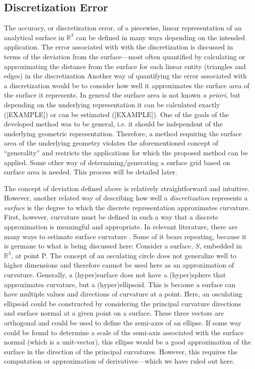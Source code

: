 \subsection{Discretization Error}
The accuracy, or discretization error, of a piecewise, linear
representation of an analytical surface in ${\mathbb R}^3$ can be
defined in many ways depending on the intended application. The error
associated with with the discretization is discussed in terms of the
deviation from the surface---most often quantified by calculating or
approximating the distance from the surface for each linear entity
(triangles and edges) in the discretization Another way of quantifying
the error associated with a discretization would be to consider how well
it approximates the surface area of the surface it represents. In
general the surface area is not known {\it a priori}, but depending on
the underlying representation it can be calculated exactly ([EXAMPLE])
or can be estimated ([EXAMPLE]).  One of the goals of the developed
method was to be general, i.e. it should be independent of the
underlying geometric representation.  Therefore, a method requiring
the surface area of the underlying geometry violates the
aforementioned concept of ``generality'' and restricts the
applications for which the proposed method can be applied. Some
other way of determining/generating a surface grid based on surface
area is needed. This process will be detailed later.

The concept of deviation defined above is relatively straightforward and
intuitive. However, another related way of describing how well a
\textit{discretization} represents a \textit{surface} is the degree to
which the discrete representation approximates curvature. First,
however, curvature must be defined in such a way that a discrete
approximation is meaningful and appropriate.  In relevant literature,
there are many ways to estimate surface curvature \cite{hermann07}. Some
of it bears repeating, because it is germane to what is being discussed
here: Consider a surface, $S$, embedded in ${\mathbb R}^3$, at point P.
The concept of an osculating circle \cite{weissteineOsculatingCircle}
does not generalize well to higher dimensions and therefore cannot be
used here as an approximation of curvature.  Generally, a (hyper)surface
does not have a (hyper)sphere that approximates curvature, but a
(hyper)ellipsoid. This is because a surface can have multiple values and
directions of curvature at a point.  Here, an osculating ellipsoid could
be constructed by considering the principal curvature directions and
surface normal at a given point on a surface. These three vectors are
orthogonal and could be used to define the semi-axes of an ellipse. If
some way could be found to determine a scale of the semi-axis associated
with the surface normal (which is a unit-vector), this ellipse would be
a good approximation of the surface in the direction of the principal
curvatures. However, this requires the computation or approximation of
derivatives---which we have ruled out here.

